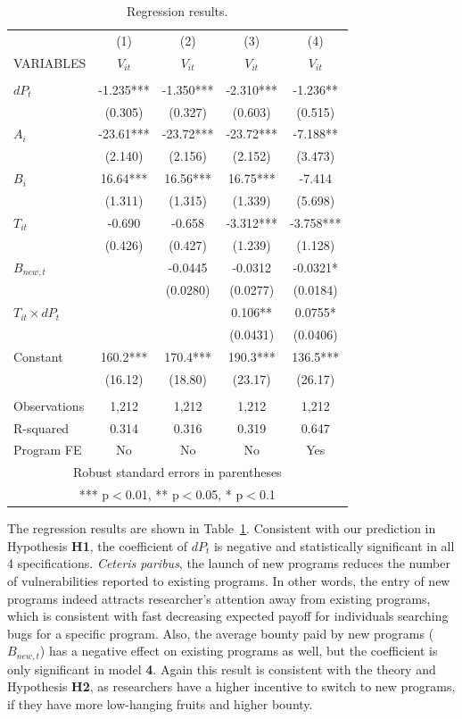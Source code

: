 \begin{table}
	\centering
	\caption{Regression results.}
	\begin{tabular}{lcccc} \hline
		& (1) & (2) & (3) & (4) \\
		VARIABLES & $V_{it}$ & $V_{it}$ & $V_{it}$ & $V_{it}$ \\ \hline
		&  &  &  &  \\
		$dP_t$ & -1.235*** & -1.350*** & -2.310*** & -1.236** \\
		& (0.305) & (0.327) & (0.603) & (0.515) \\
		$A_i$ & -23.61*** & -23.72*** & -23.72*** & -7.188** \\
		& (2.140) & (2.156) & (2.152) & (3.473) \\
		$B_i$ & 16.64*** & 16.56*** & 16.75*** & -7.414 \\
		& (1.311) & (1.315) & (1.339) & (5.698) \\
		$T_{it}$ & -0.690 & -0.658 & -3.312*** & -3.758*** \\
		& (0.426) & (0.427) & (1.239) & (1.128) \\
		$B_{new,t}$ &  & -0.0445 & -0.0312 & -0.0321* \\
		&  & (0.0280) & (0.0277) & (0.0184) \\
		$T_{it} \times dP_t$ &  &  & 0.106** & 0.0755* \\
		&  &  & (0.0431) & (0.0406) \\
		Constant & 160.2*** & 170.4*** & 190.3*** & 136.5*** \\
		& (16.12) & (18.80) & (23.17) & (26.17) \\
		&  &  &  &  \\
		Observations & 1,212 & 1,212 & 1,212 & 1,212 \\
		R-squared & 0.314 & 0.316 & 0.319 & 0.647 \\
		Program FE & No & No & No & Yes \\ \hline
		\multicolumn{5}{c}{ Robust standard errors in parentheses} \\
		\multicolumn{5}{c}{ *** p$<$0.01, ** p$<$0.05, * p$<$0.1} \\
	\end{tabular}
	
	\label{tab:reg}
\end{table}

\noindent The regression results are shown in Table~\ref{tab:reg}. Consistent with our prediction in Hypothesis {\bf H1}, the coefficient of $dP_t$ is negative and statistically significant in all 4 specifications. {\it Ceteris paribus}, the launch of new programs reduces the number of vulnerabilities reported to existing programs. In other words, the entry of new programs indeed attracts researcher's attention away from existing programs, which is consistent with fast decreasing expected payoff for individuals searching bugs for a specific program. Also, the average bounty paid by new programs ($B_{new,t}$) has a negative effect on existing programs as well, but the coefficient is only significant in model {\bf 4}. Again this result is consistent with the theory and Hypothesis {\bf H2}, as researchers have a higher incentive to switch to new programs, if they have more low-hanging fruits and higher bounty.\\

